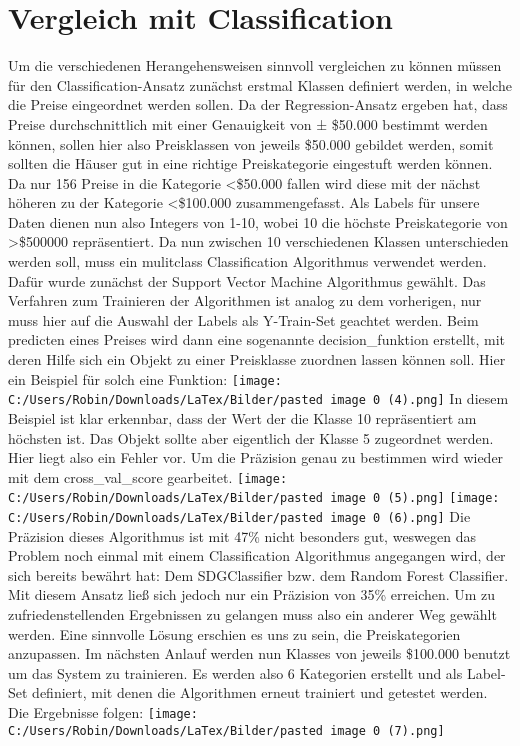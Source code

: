 \section{Vergleich mit Classification}
\label{vergleichMitClassification}
Um die verschiedenen Herangehensweisen sinnvoll vergleichen zu können müssen für den Classification-Ansatz zunächst erstmal Klassen definiert werden, in welche die Preise eingeordnet werden sollen. 
Da der Regression-Ansatz ergeben hat, dass Preise durchschnittlich mit einer Genauigkeit von ± \$50.000 bestimmt werden können, sollen hier also Preisklassen von jeweils \$50.000 gebildet werden, somit sollten die Häuser gut in eine richtige Preiskategorie eingestuft werden können. Da nur 156 Preise in die Kategorie <\$50.000 fallen wird diese mit der nächst höheren zu der Kategorie <\$100.000 zusammengefasst.
Als Labels für unsere Daten dienen nun also Integers von 1-10, wobei 10 die höchste Preiskategorie von >\$500000 repräsentiert.
Da nun zwischen 10 verschiedenen Klassen unterschieden werden soll, muss ein mulitclass Classification Algorithmus verwendet werden. Dafür wurde zunächst der Support Vector Machine Algorithmus gewählt. 
Das Verfahren zum Trainieren der Algorithmen ist analog zu dem vorherigen, nur muss hier auf die Auswahl der Labels als Y-Train-Set geachtet werden. 
Beim predicten eines Preises wird dann eine sogenannte decision\_funktion erstellt, mit deren Hilfe sich ein Objekt zu einer Preisklasse zuordnen lassen können soll.
Hier ein Beispiel für solch eine Funktion:
\newline
\texttt{[image: C:/Users/Robin/Downloads/LaTex/Bilder/pasted image 0 (4).png]}
\newline
In diesem Beispiel ist klar erkennbar, dass der Wert der die Klasse 10 repräsentiert am höchsten ist. Das Objekt sollte aber eigentlich der Klasse 5 zugeordnet werden. 
Hier liegt also ein Fehler vor. Um die Präzision genau zu bestimmen wird wieder mit dem cross\_val\_score gearbeitet.
\newline
\texttt{[image: C:/Users/Robin/Downloads/LaTex/Bilder/pasted image 0 (5).png]}
\texttt{[image: C:/Users/Robin/Downloads/LaTex/Bilder/pasted image 0 (6).png]} \linebreak
Die Präzision dieses Algorithmus ist mit 47\% nicht besonders gut, weswegen das Problem noch einmal mit einem Classification Algorithmus angegangen wird, der sich bereits bewährt hat: Dem SDGClassifier bzw. dem Random Forest Classifier. Mit diesem Ansatz ließ sich jedoch nur ein Präzision von 35\% erreichen. Um zu zufriedenstellenden Ergebnissen zu gelangen muss also ein anderer Weg gewählt werden. 
\newline
\newline
Eine sinnvolle Lösung erschien es uns zu sein, die Preiskategorien anzupassen. Im nächsten Anlauf werden nun Klasses von jeweils \$100.000 benutzt um das System zu trainieren. Es werden also 6 Kategorien erstellt und als Label-Set definiert, mit denen die Algorithmen erneut trainiert und getestet werden. Die Ergebnisse folgen:
\newline
\texttt{[image: C:/Users/Robin/Downloads/LaTex/Bilder/pasted image 0 (7).png]}
\newline

